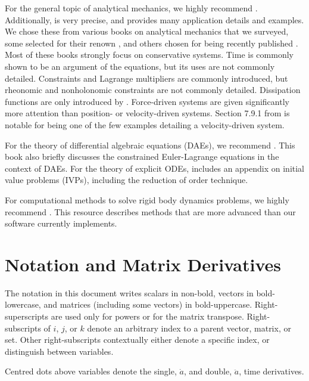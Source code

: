 \documentclass[11pt]{article}
\begin{document}
For the general topic of analytical mechanics, we highly recommend \cite{RFb-07}. Additionally, \cite{RFb-02} is very precise, and \cite{RFb-05} provides many application details and examples. We chose these from various books on analytical mechanics that we surveyed, some selected for their renown \cite{RFb-05,RFb-06,RFb-07,RFb-08,RFb-09,RFb-10,RFb-12}, and others chosen for being recently published \cite{RFb-01,RFb-02,RFb-03,RFb-04}. Most of these books strongly focus on conservative systems. Time is commonly shown to be an argument of the equations, but its uses are not commonly detailed. Constraints and Lagrange multipliers are commonly introduced, but rheonomic and nonholonomic constraints are not commonly detailed. Dissipation functions are only introduced by \cite{RFb-05,RFb-07,RFb-10,RFb-12}. Force-driven systems are given significantly more attention than position- or velocity-driven systems. Section 7.9.1 from \cite{RFb-05} is notable for being one of the few examples detailing a velocity-driven system.

For the theory of differential algebraic equations (DAEs), we recommend \cite{RFb-11}. This book also briefly discusses the constrained Euler-Lagrange equations in the context of DAEs. For the theory of explicit ODEs, \cite{RFb-02} includes an appendix on initial value problems (IVPs), including the reduction of order technique.

For computational methods to solve rigid body dynamics problems, we highly recommend \cite{RFb-13}. This resource describes methods that are more advanced than our software currently implements.


\section{Notation and Matrix Derivatives} \label{sec:notation}
The notation in this document writes scalars in non-bold, vectors in bold-lowercase, and matrices (including some vectors) in bold-uppercase. Right-superscripts are used only for powers or for the matrix transpose. Right-subscripts of $i$, $j$, or $k$ denote an arbitrary index to a parent vector, matrix, or set. Other right-subscripts contextually either denote a specific index, or distinguish between variables.

Centred dots above variables denote the single, $\dot{a}$, and double, $\ddot{a}$, time derivatives.
\end{document}
